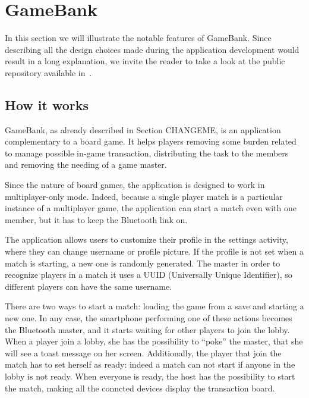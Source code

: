 \section{GameBank}

In this section we will illustrate the notable features of GameBank. Since 
describing all the design choices made during the application development would 
result in a long explanation, we invite the reader to take a look at the public 
repository available in~\cite{gamebank18}.

\subsection{How it works}

GameBank, as already described in Section CHANGEME,  is an application complementary to a board game. It helps players 
removing some burden related to manage possible in-game transaction, 
distributing the task to the members and removing the needing of a game master.

Since the nature of board games, the application is designed to work 
in multiplayer-only mode. Indeed, because a single player match is a particular 
instance of a multiplayer game, the application can start a match even with one 
member, but it has to keep the Bluetooth link on.

The application allows users to customize their profile in the settings 
activity, where they can change username or profile picture. If the profile is 
not set when a match is starting, a new one is randomly generated. The master 
in order to recognize players in a match it uses a UUID (Universally Unique 
Identifier), so different players can have the same username.

There are two ways to start a match: loading the game from a save and starting 
a new one. In any case, the smartphone performing one of these actions becomes 
the Bluetooth master, and it starts waiting for other players to join the 
lobby. When a player join a lobby, she has the possibility to ``poke'' the 
master, that she will see a toast message on her screen. Additionally, the 
player that join the match has to set herself as ready: indeed a match can not 
start if anyone in the lobby is not ready.
When everyone is ready, the host has the possibility to start the match, making 
all the conncted devices display the transaction board.